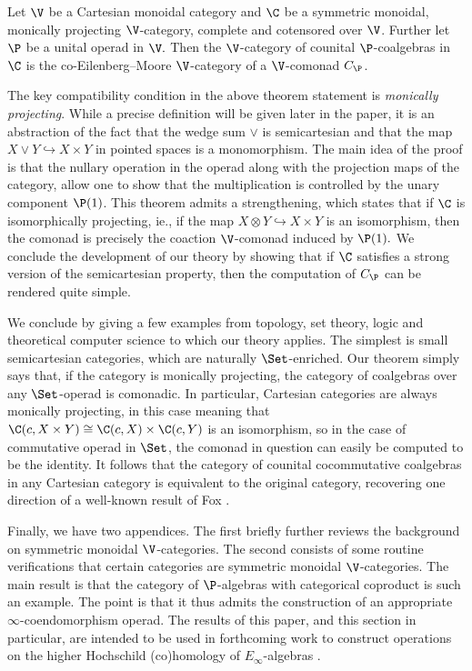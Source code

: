 \documentclass{tac}
\begin{document}
\begin{theorem}
\label{mainthm}
    Let $\V$ be a Cartesian monoidal category and $\C$ be a symmetric monoidal, monically projecting $\V$-category, complete and cotensored over $\V$. Further let $\P$ be a unital operad in $\V.$ Then the $\V$-category of counital $\P$-coalgebras in $\C$ is the co-Eilenberg--Moore $\V$-category of a $\V$-comonad $C_\P$. 
\end{theorem}

The key compatibility condition in the above theorem statement is \emph{monically projecting}. While a precise definition will be given later in the paper, it is an abstraction of the fact that the wedge sum $\vee$ is semicartesian and that the map $X\vee Y \hookrightarrow X\times Y$ in pointed spaces is a monomorphism. The main idea of the proof is that the nullary operation in the operad along with the projection maps of the category, allow one to show that the multiplication is controlled by the unary component $\P(1)$. This theorem admits a strengthening, which states that if $\C$ is isomorphically projecting, ie., if the map $X\otimes Y \hookrightarrow X\times Y$ is an isomorphism, then the comonad is precisely the coaction $\V$-comonad induced by $\P(1).$ We conclude the development of our theory by showing that if $\C$ satisfies a strong version of the semicartesian property, then the computation of $C_\P$ can be rendered quite simple.

We conclude by giving a few examples from topology, set theory, logic and theoretical computer science to which our theory applies. The simplest is small semicartesian categories, which are naturally $\Set$-enriched. Our theorem simply says that, if the category is monically projecting, the category of coalgebras over any $\Set$-operad is comonadic. In particular, Cartesian categories are always monically projecting, in this case meaning that $\C(c, X\times Y) \cong \C(c, X) \times  \C(c, Y) $ is an isomorphism, so in the case of commutative operad in $\Set$, the comonad in question can easily be computed to be the identity. It follows that the category of counital cocommutative coalgebras in any Cartesian category is equivalent to the original category, recovering one direction of a well-known result of Fox \cite{fox76}.

Finally, we have two appendices. The first briefly further reviews the background on symmetric monoidal $\V$-categories. The second consists of some routine verifications that certain categories are symmetric monoidal $\V$-categories. The main result is that the category of $\P$-algebras with categorical coproduct is such an example. The point is that it thus admits the construction of an appropriate $\infty$-coendomorphism operad. The results of this paper, and this section in particular, are intended to be used in forthcoming work to construct operations on the higher Hochschild (co)homology of $E_\infty$-algebras \cite{flynn26}.
\end{document}
